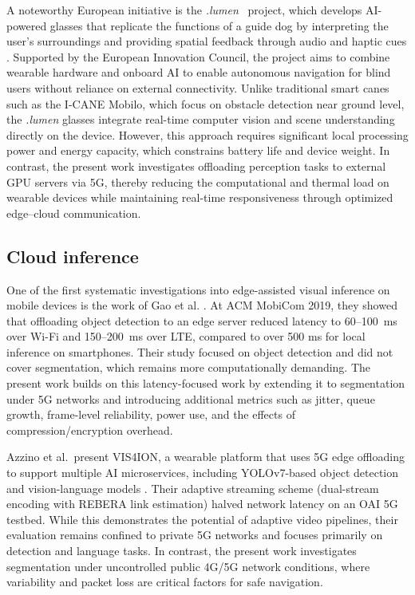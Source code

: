 \documentclass{ieeeaccess}
\begin{document}
A noteworthy European initiative is the \textit{.lumen}~\cite{dotlumen2025} project, which develops AI-powered glasses that replicate the functions of a guide dog by interpreting the user’s surroundings and providing spatial feedback through audio and haptic cues \cite{dotlumen2025}. Supported by the European Innovation Council, the project aims to combine wearable hardware and onboard AI to enable autonomous navigation for blind users without reliance on external connectivity. Unlike traditional smart canes such as the I-CANE Mobilo, which focus on obstacle detection near ground level, the \textit{.lumen} glasses integrate real-time computer vision and scene understanding directly on the device. However, this approach requires significant local processing power and energy capacity, which constrains battery life and device weight. In contrast, the present work investigates offloading perception tasks to external GPU servers via 5G, thereby reducing the computational and thermal load on wearable devices while maintaining real-time responsiveness through optimized edge–cloud communication.

\subsection{Cloud inference}

One of the first systematic investigations into edge-assisted visual inference on mobile devices is the work of Gao et al. \cite{gao2019edge}. At ACM MobiCom 2019, they showed that offloading object detection to an edge server reduced latency to 60--100~ms over Wi-Fi and 150--200~ms over LTE, compared to over 500 ms for local inference on smartphones. Their study focused on object detection and did not cover segmentation, which remains more computationally demanding. The present work builds on this latency-focused work by extending it to segmentation under 5G networks and introducing additional metrics such as jitter, queue growth, frame-level reliability, power use, and the effects of compression/encryption overhead.

Azzino et al.\ present VIS4ION, a wearable platform that uses 5G edge offloading to support multiple AI microservices, including YOLOv7-based object detection and vision-language models \cite{azzino2023vis4ion}. Their adaptive streaming scheme (dual-stream encoding with REBERA link estimation) halved network latency on an OAI 5G testbed. While this demonstrates the potential of adaptive video pipelines, their evaluation remains confined to private 5G networks and focuses primarily on detection and language tasks. In contrast, the present work investigates segmentation under uncontrolled public 4G/5G network conditions, where variability and packet loss are critical factors for safe navigation.
\end{document}
